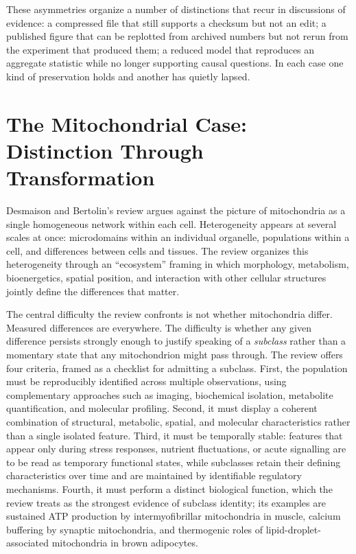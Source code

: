 \documentclass[11pt]{article}
\theoremstyle{remark}
\begin{document}
These asymmetries organize a number of distinctions that recur in discussions of evidence: a compressed file that still supports a checksum but not an edit; a published figure that can be replotted from archived numbers but not rerun from the experiment that produced them; a reduced model that reproduces an aggregate statistic while no longer supporting causal questions. In each case one kind of preservation holds and another has quietly lapsed.

\section{The Mitochondrial Case: Distinction Through Transformation}

Desmaison and Bertolin's review \cite{desmaison} argues against the picture of mitochondria as a single homogeneous network within each cell. Heterogeneity appears at several scales at once: microdomains within an individual organelle, populations within a cell, and differences between cells and tissues. The review organizes this heterogeneity through an ``ecosystem'' framing in which morphology, metabolism, bioenergetics, spatial position, and interaction with other cellular structures jointly define the differences that matter.

The central difficulty the review confronts is not whether mitochondria differ. Measured differences are everywhere. The difficulty is whether any given difference persists strongly enough to justify speaking of a \emph{subclass} rather than a momentary state that any mitochondrion might pass through. The review offers four criteria, framed as a checklist for admitting a subclass. First, the population must be reproducibly identified across multiple observations, using complementary approaches such as imaging, biochemical isolation, metabolite quantification, and molecular profiling. Second, it must display a coherent combination of structural, metabolic, spatial, and molecular characteristics rather than a single isolated feature. Third, it must be temporally stable: features that appear only during stress responses, nutrient fluctuations, or acute signalling are to be read as temporary functional states, while subclasses retain their defining characteristics over time and are maintained by identifiable regulatory mechanisms. Fourth, it must perform a distinct biological function, which the review treats as the strongest evidence of subclass identity; its examples are sustained ATP production by intermyofibrillar mitochondria in muscle, calcium buffering by synaptic mitochondria, and thermogenic roles of lipid-droplet-associated mitochondria in brown adipocytes.
\end{document}
